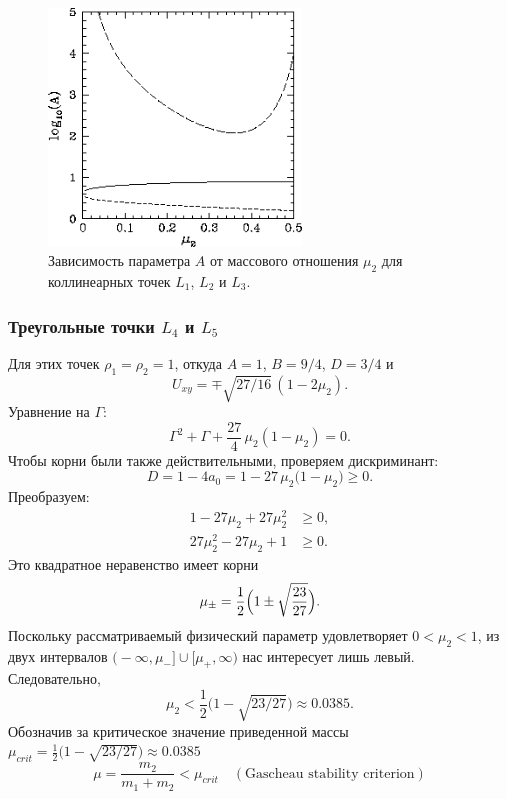 \documentclass[12pt]{article}
\newcommand{\mutwo}{\mu_2}
\begin{document}
\begin{figure}[H]
  \centering
  \includegraphics[width=0.6\textwidth]{image2.png}
  \caption{Зависимость параметра $A$ от массового отношения $\mutwo$ для коллинеарных точек $L_1$, $L_2$ и $L_3$.}
  \label{fig:A_vs_mu}
\end{figure}

\subsubsection{Треугольные точки $L_4$ и $L_5$}
Для этих точек $\rho_1=\rho_2=1$, откуда $A=1$, $B=9/4$, $D=3/4$ и
\[U_{xy}=\mp\sqrt{27/16}\,(1-2\mutwo).\]
Уравнение на $\Gamma$:
\begin{equation}
  \Gamma^{2}+\Gamma+\frac{27}{4}\,\mutwo(1-\mutwo)=0.
\end{equation}
Чтобы корни были также действительными, проверяем дискриминант:
\begin{equation}
D=1-4a_0=1-27\,\mu_2\bigl(1-\mu_2\bigr)\ge0.
\end{equation}
Преобразуем:
\begin{align}
1-27\mu_2+27\mu_2^2&\ge0,\\[2pt]
27\mu_2^2-27\mu_2+1&\ge0.
\end{align}
Это квадратное неравенство имеет корни
\[\mu_{\pm}=\frac12\Bigl(1\pm\sqrt{\frac{23}{27}}\Bigr).
\]
Поскольку рассматриваемый физический параметр удовлетворяет \(0<\mu_2<1\),
из двух интервалов
\(\bigl(-\infty,\mu_-\bigr]\cup\bigl[\mu_+,\infty\bigr)\)
нас интересует лишь левый.  Следовательно,
\begin{equation}
  \mutwo<\frac12\bigl(1-\sqrt{23/27}\bigr)\approx0.0385.
\end{equation}
Обозначив за критическое значение приведенной массы $\mu_{crit} = \frac12\bigl(1-\sqrt{23/27}\bigr)\approx0.0385$
\begin{equation}
  \mu = \frac{m_2}{m_1+m_2}< \mu_{crit} \quad(\text{Gascheau stability criterion})
\end{equation}
\end{document}
